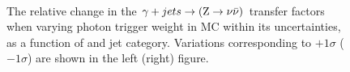 \begin{figure}[!h]
  \centering
   ~~
  \\

  \caption{\label{fig:tfSyst_photonTrigger_gjToZinv} The relative change in
  the $\gamma + jets \rightarrow ({\text Z} \rightarrow \nu\bar{\nu})$ transfer
  factors when varying photon trigger weight in MC within its uncertainties, as a function of \scalht and jet category. 
  Variations corresponding to $+1\sigma$ ($-1\sigma$) are shown in the left (right) figure. 
  }
\end{figure}



